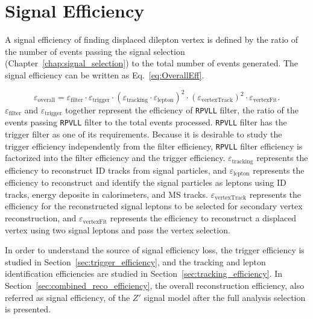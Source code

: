 \chapter{Signal Efficiency}
\label{chap:eff}

A signal efficiency of finding displaced dilepton vertex is defined by the ratio of the number of events passing the signal selection (Chapter~\ref{chap:signal_selection}) to the total number of events generated. The signal efficiency can be written as Eq.~\ref{eq:OverallEff}. 

\begin{equation}
\label{eq:OverallEff}
\varepsilon_{\mathrm{overall}} = \varepsilon_{\mathrm{filter}} \cdot \varepsilon_{\mathrm{trigger}} \cdot 
                     (\varepsilon_{\mathrm{tracking}} \cdot \varepsilon_{\mathrm{lepton}})^2 \cdot
                     (\varepsilon_{\mathrm{vertexTrack}})^2 \cdot
                     \varepsilon_{\mathrm{vertexFit}}.
\end{equation}
%
$\varepsilon_{\mathrm{filter}}$ and $\varepsilon_{\mathrm{trigger}}$ together represent the efficiency of \texttt{RPVLL} filter, the ratio of the events passing \texttt{RPVLL} filter to the total events processed. \texttt{RPVLL} filter has the trigger filter as one of its requirements. Because it is desirable to study the trigger efficiency independently from the filter efficiency, \texttt{RPVLL} filter efficiency is factorized into the filter efficiency and the trigger efficiency. $\varepsilon_{\mathrm{tracking}}$ represents the efficiency to reconstruct ID tracks from signal particles, and $\varepsilon_{\mathrm{lepton}}$ represents the efficiency to reconstruct and identify the signal particles as leptons using ID tracks, energy deposite in calorimeters, and MS tracks. $\varepsilon_{\mathrm{vertexTrack}}$ represents the efficiency for the reconstructed signal leptons to be selected for secondary vertex reconstruction, and $\varepsilon_{\mathrm{vertexFit}}$ represents the efficiency to reconstruct a displaced vertex using two signal leptons and pass the vertex selection.

In order to understand the source of signal efficiency loss, the trigger efficiency is studied in Section~\ref{sec:trigger_efficiency}, and the tracking and lepton identification efficiencies are studied in Section~\ref{sec:tracking_efficiency}. In Section~\ref{sec:combined_reco_efficiency}, the overall reconstruction efficiency, also referred as signal efficiency, of the $Z'$ signal model after the full analysis selection is presented. 


